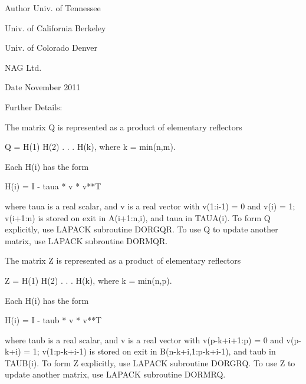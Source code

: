 \begin{DoxyAuthor}{Author}
Univ. of Tennessee 

Univ. of California Berkeley 

Univ. of Colorado Denver 

N\+A\+G Ltd. 
\end{DoxyAuthor}
\begin{DoxyDate}{Date}
November 2011 
\end{DoxyDate}
\begin{DoxyParagraph}{Further Details\+: }
\begin{DoxyVerb}  The matrix Q is represented as a product of elementary reflectors

     Q = H(1) H(2) . . . H(k), where k = min(n,m).

  Each H(i) has the form

     H(i) = I - taua * v * v**T

  where taua is a real scalar, and v is a real vector with
  v(1:i-1) = 0 and v(i) = 1; v(i+1:n) is stored on exit in A(i+1:n,i),
  and taua in TAUA(i).
  To form Q explicitly, use LAPACK subroutine DORGQR.
  To use Q to update another matrix, use LAPACK subroutine DORMQR.

  The matrix Z is represented as a product of elementary reflectors

     Z = H(1) H(2) . . . H(k), where k = min(n,p).

  Each H(i) has the form

     H(i) = I - taub * v * v**T

  where taub is a real scalar, and v is a real vector with
  v(p-k+i+1:p) = 0 and v(p-k+i) = 1; v(1:p-k+i-1) is stored on exit in
  B(n-k+i,1:p-k+i-1), and taub in TAUB(i).
  To form Z explicitly, use LAPACK subroutine DORGRQ.
  To use Z to update another matrix, use LAPACK subroutine DORMRQ.\end{DoxyVerb}
 
\end{DoxyParagraph}
